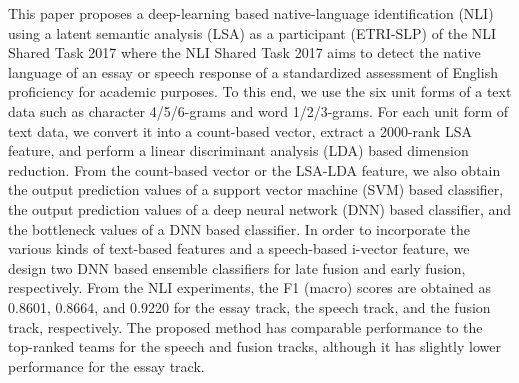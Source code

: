 This paper proposes a deep-learning based native-language identification (NLI) using a latent semantic analysis (LSA) as a participant (ETRI-SLP) of the NLI Shared Task 2017 where the NLI Shared Task 2017 aims to detect the native language of an essay or speech response of a standardized assessment of English proficiency for academic purposes. To this end, we use the six unit forms of a text data such as character 4/5/6-grams and word 1/2/3-grams. For each unit form of text data, we convert it into a count-based vector, extract a 2000-rank LSA feature, and perform a linear discriminant analysis (LDA) based dimension reduction. From the count-based vector or the LSA-LDA feature, we also obtain the output prediction values of a support vector machine (SVM) based classifier, the output prediction values of a deep neural network (DNN) based classifier, and the bottleneck values of a DNN based classifier. In order to incorporate the various kinds of text-based features and a speech-based i-vector feature, we design two DNN based ensemble classifiers for late fusion and early fusion, respectively. From the NLI experiments, the F1 (macro) scores are obtained as 0.8601, 0.8664, and 0.9220 for the essay track, the speech track, and the fusion track, respectively. The proposed method has comparable performance to the top-ranked teams for the speech and fusion tracks, although it has slightly lower performance for the essay track.
